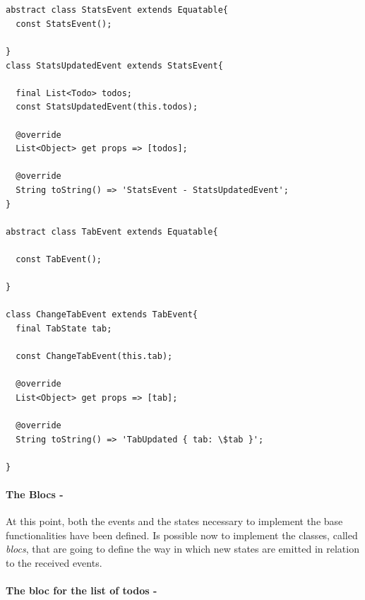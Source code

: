 \begin{code}
\mbox{}
 \mbox{}
\label{code:2.14}
\begin{verbatim}


abstract class StatsEvent extends Equatable{
  const StatsEvent();

}
class StatsUpdatedEvent extends StatsEvent{

  final List<Todo> todos;
  const StatsUpdatedEvent(this.todos);

  @override
  List<Object> get props => [todos];

  @override
  String toString() => 'StatsEvent - StatsUpdatedEvent';
}

abstract class TabEvent extends Equatable{

  const TabEvent();

}

class ChangeTabEvent extends TabEvent{
  final TabState tab;

  const ChangeTabEvent(this.tab);

  @override
  List<Object> get props => [tab];

  @override
  String toString() => 'TabUpdated { tab: \$tab }';

}
\end{verbatim}
\mbox{}
\end{code}

\paragraph{The Blocs - }
\label{subpar:todo_app_bloc_core_state}

At this point, both the events and the states necessary to implement the base functionalities have been defined. Is possible now to implement the classes, called \textit{blocs}, that are going to define the way in which new states are emitted in relation to the received events.

\paragraph{The bloc for the list of todos - }
\label{subpar:todo_app_bloc_core_state}

